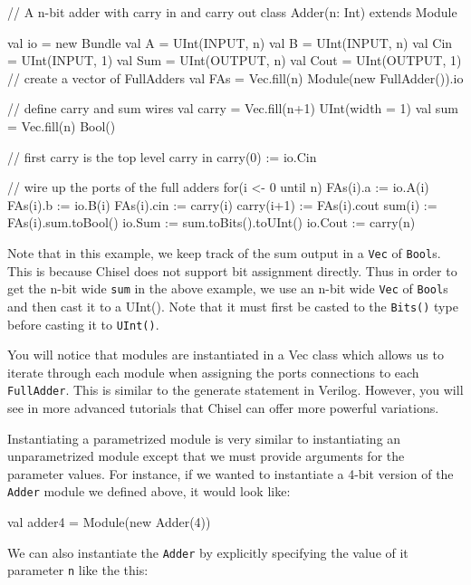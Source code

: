 \begin{scala}

// A n-bit adder with carry in and carry out
class Adder(n: Int) extends Module {
  val io = new Bundle {
    val A    = UInt(INPUT, n)
    val B    = UInt(INPUT, n)
    val Cin  = UInt(INPUT, 1)
    val Sum  = UInt(OUTPUT, n)
    val Cout = UInt(OUTPUT, 1)
  }
  // create a vector of FullAdders
  val FAs = Vec.fill(n){ Module(new FullAdder()).io }

  // define carry and sum wires
  val carry = Vec.fill(n+1){ UInt(width = 1) }
  val sum   = Vec.fill(n){ Bool() } 

  // first carry is the top level carry in
  carry(0) := io.Cin

  // wire up the ports of the full adders
  for(i <- 0 until n) {
     FAs(i).a   := io.A(i)
     FAs(i).b   := io.B(i)
     FAs(i).cin := carry(i)
     carry(i+1) := FAs(i).cout
     sum(i)     := FAs(i).sum.toBool()
  }
  io.Sum  := sum.toBits().toUInt()
  io.Cout := carry(n)
}

\end{scala}

Note that in this example, we keep track of the sum output in a \verb+Vec+ of \verb+Bool+s. This is because Chisel does not support bit assignment directly. Thus in order to get the n-bit wide \verb+sum+ in the above example, we use an n-bit wide \verb+Vec+ of \verb+Bool+s and then cast it to a UInt(). Note that it must first be casted to the \verb+Bits()+ type before casting it to \verb+UInt()+.

You will notice that modules are instantiated in a Vec class which allows us to iterate through each module when assigning the ports connections to each \verb+FullAdder+. This is similar to the generate statement in Verilog. However, you will see in more advanced tutorials that Chisel can offer more powerful variations.

Instantiating a parametrized module is very similar to instantiating an unparametrized module except that we must provide arguments for the parameter values. For instance, if we wanted to instantiate a 4-bit version of the \verb+Adder+ module we defined above, it would look like:

\begin{scala}
val adder4 = Module(new Adder(4))
\end{scala}

We can also instantiate the \verb+Adder+ by explicitly specifying the value of it parameter \verb+n+ like the this:

